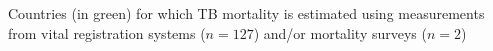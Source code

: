 \label{fig:vr}Countries (in green) for which TB mortality is estimated using measurements from vital registration systems ($n=127$) and/or mortality surveys ($n=2$)